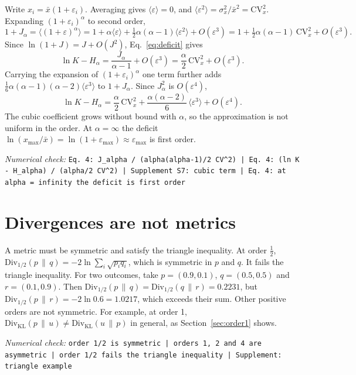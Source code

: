 \documentclass[11pt]{article}
\newcommand{\Div}{\mathrm{Div}}
\newcommand{\KL}{\Div_{\mathrm{KL}}}
\newcommand{\CV}{\mathrm{CV}}
\newcommand{\numcheck}[1]{\par{\small\raggedright\noindent\textit{Numerical check:} \texttt{#1}\par}}
\begin{document}
Write $x_i = \bar x(1+\varepsilon_i)$. Averaging gives $\langle\varepsilon\rangle = 0$, and
$\langle\varepsilon^2\rangle = \sigma_x^2/\bar x^2 = \CV_x^2$. Expanding $(1+\varepsilon_i)^{\alpha}$ to second order,
\begin{equation}
1+J_\alpha = \langle(1+\varepsilon)^{\alpha}\rangle
= 1 + \alpha\langle\varepsilon\rangle + \tfrac12\alpha(\alpha-1)\langle\varepsilon^2\rangle + O(\varepsilon^3)
= 1 + \tfrac12\alpha(\alpha-1)\,\CV_x^2 + O(\varepsilon^3) .
\end{equation}
Since $\ln(1+J) = J + O(J^2)$, Eq.~\eqref{eq:deficit} gives
\begin{equation}
\ln K - H_\alpha = \frac{J_\alpha}{\alpha-1} + O(\varepsilon^3) = \frac{\alpha}{2}\,\CV_x^2 + O(\varepsilon^3) .
\end{equation}
Carrying the expansion of $(1+\varepsilon_i)^{\alpha}$ one term further adds
$\tfrac16\alpha(\alpha-1)(\alpha-2)\langle\varepsilon^3\rangle$ to $1+J_\alpha$. Since $J_\alpha^2$ is $O(\varepsilon^4)$,
\begin{equation}
\ln K - H_\alpha = \frac{\alpha}{2}\,\CV_x^2 + \frac{\alpha(\alpha-2)}{6}\,\langle\varepsilon^3\rangle + O(\varepsilon^4) .
\end{equation}
The cubic coefficient grows without bound with $\alpha$, so the approximation is not uniform in the order. At
$\alpha=\infty$ the deficit $\ln(x_{\max}/\bar x) = \ln(1+\varepsilon_{\max})\approx\varepsilon_{\max}$ is first order.
\numcheck{Eq. 4: J\_alpha / (alpha(alpha-1)/2 CV\^{}2) | Eq. 4: (ln K - H\_alpha) / (alpha/2 CV\^{}2) | Supplement S7: cubic term | Eq. 4: at alpha = infinity the deficit is first order}

\section{Divergences are not metrics}

A metric must be symmetric and satisfy the triangle inequality. At order $\tfrac12$,
$\Div_{1/2}(p\,\|\,q) = -2\ln\sum_i\sqrt{p_iq_i}$, which is symmetric in $p$ and $q$. It fails the triangle
inequality. For two outcomes, take $p=(0.9,0.1)$, $q=(0.5,0.5)$ and $r=(0.1,0.9)$. Then
$\Div_{1/2}(p\,\|\,q) = \Div_{1/2}(q\,\|\,r) = 0.2231$, but $\Div_{1/2}(p\,\|\,r) = -2\ln0.6 = 1.0217$, which exceeds
their sum. Other positive orders are not symmetric. For example, at order 1,
$\KL(p\,\|\,u) \ne \KL(u\,\|\,p)$ in general, as Section~\ref{sec:order1} shows.
\numcheck{order 1/2 is symmetric | orders 1, 2 and 4 are asymmetric | order 1/2 fails the triangle inequality | Supplement: triangle example}
\end{document}
